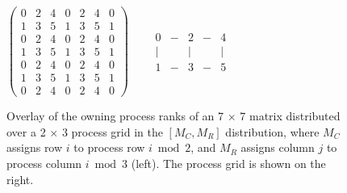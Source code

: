 \begin{figure}
\centering
$
\left(\begin{array}{cccccccc}
 0 & 2 & 4 & 0 & 2 & 4 & 0 \\
 1 & 3 & 5 & 1 & 3 & 5 & 1 \\
 0 & 2 & 4 & 0 & 2 & 4 & 0 \\
 1 & 3 & 5 & 1 & 3 & 5 & 1 \\
 0 & 2 & 4 & 0 & 2 & 4 & 0 \\
 1 & 3 & 5 & 1 & 3 & 5 & 1 \\
 0 & 2 & 4 & 0 & 2 & 4 & 0 
\end{array}\right)\;\;\;\;\;\;\;
\begin{array}{ccccc}
0 & - & 2 & - & 4 \\
| &   & | &   & | \\
1 & - & 3 & - & 5
\end{array}
$
\caption{Overlay of the owning process ranks of an 7 $\times$ 7 matrix 
distributed over a 2 $\times$ 3 process grid in the $[M_C,M_R]$ distribution, 
where $M_C$ assigns row $i$ to process row $i \bmod 2$, and $M_R$ assigns column
$j$ to process column $i \bmod 3$ (left). The process grid is shown on the 
right.}
\label{fig:mcmr}
\end{figure}
